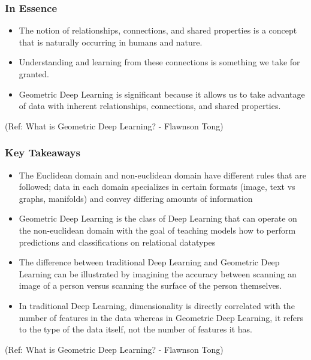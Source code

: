 \begin{frame}[fragile]\frametitle{In Essence}


\begin{itemize}
\item The notion of relationships, connections, and shared properties is a concept that is naturally occurring in humans and nature. 
\item Understanding and learning from these connections is something we take for granted. 
\item Geometric Deep Learning is significant because it allows us to take advantage of data with inherent relationships, connections, and shared properties.
\end{itemize}
	  
{\tiny (Ref: What is Geometric Deep Learning? - Flawnson Tong)}

\end{frame}


\begin{frame}[fragile]\frametitle{Key Takeaways}


\begin{itemize}
\item  The Euclidean domain and non-euclidean domain have different rules that are followed; data in each domain specializes in certain formats (image, text vs graphs, manifolds) and convey differing amounts of information
\item  Geometric Deep Learning is the class of Deep Learning that can operate on the non-euclidean domain with the goal of teaching models how to perform predictions and classifications on relational datatypes
\item  The difference between traditional Deep Learning and Geometric Deep Learning can be illustrated by imagining the accuracy between scanning an image of a person versus scanning the surface of the person themselves.
\item  In traditional Deep Learning, dimensionality is directly correlated with the number of features in the data whereas in Geometric Deep Learning, it refers to the type of the data itself, not the number of features it has.
\end{itemize}
	  
{\tiny (Ref: What is Geometric Deep Learning? - Flawnson Tong)}

\end{frame}


